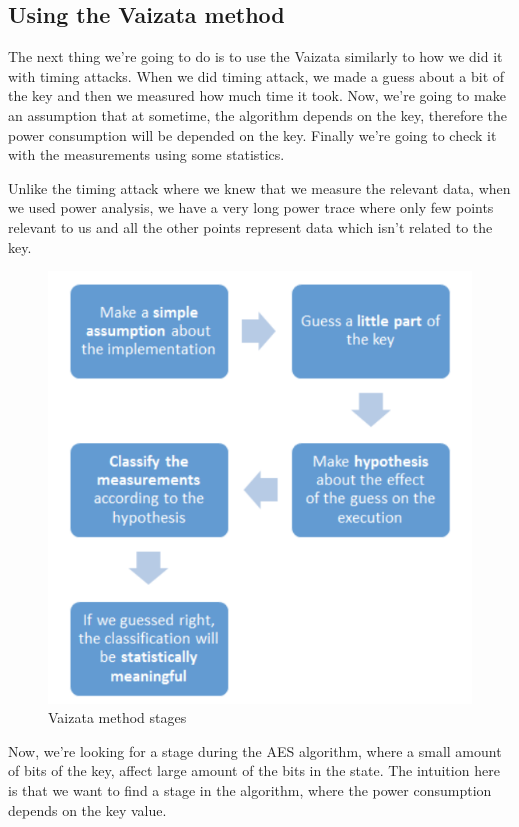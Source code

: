\subsection{Using the Vaizata method}
The next thing we're going to do is to use the Vaizata similarly to how we did it with timing attacks. When we did timing attack, we made a guess about a bit of the key and then we measured how much time it took. Now, we're going to make an assumption that at sometime, the algorithm depends on the key, therefore the power consumption will be depended on the key. Finally we're going to check it with the measurements using some statistics. 

Unlike the timing attack where we knew that we measure the relevant data, when we used power analysis, we have a very long power trace where only few points relevant to us and all the other points represent data which isn't related to the key.

\begin{figure}[H]
\centering
\includegraphics[height=0.9\textwidth]{images/Lecture6/vaizata.png}
\caption{Vaizata method stages}
\label{fig:vaizata}
\end{figure}

Now, we're looking for a stage during the AES algorithm, where a small amount of bits of the key, affect large amount of the bits in the state. The intuition here is that we want to find a stage in the algorithm, where the power consumption depends on the key value.

